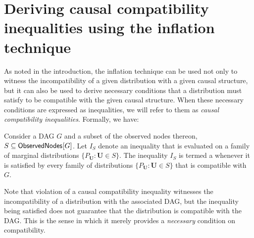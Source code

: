 

\section{Deriving causal compatibility inequalities using the inflation technique}

As noted in the introduction, the inflation technique can be used not only to witness the incompatibility of a given distribution with a given causal structure, but it can also be used to derive necessary conditions that a distribution must satisfy to be compatible with the given causal structure.   When these necessary conditions are expressed as inequalities, we will refer to them as {\em causal compatibility inequalities}.  Formally, we have:
\begin{definition}
Consider a DAG $G$ and a subset of the observed nodes thereon, $S \subseteq {\operatorname{\mathsf{ObservedNodes}}_{}}\lbrack G\rbrack$.  Let $I_S$ denote an inequality that is evaluated on a family of marginal distributions  $\{ P_{\bm{U}}: \bm{U} \in S\}$.  The inequality $I_S$ is termed a   whenever it is satisfied by every family of distributions $\{ P_{\bm{U}}: \bm{U} \in S\}$ that is compatible with $G$.
\end{definition}
Note that violation of a causal compatibility inequality witnesses the incompatibility of a distribution with the associated DAG, but the inequality being satisfied does not guarantee that the distribution is compatible with the DAG.  This is the sense in which it merely provides a {\em necessary} condition on compatibility. 

